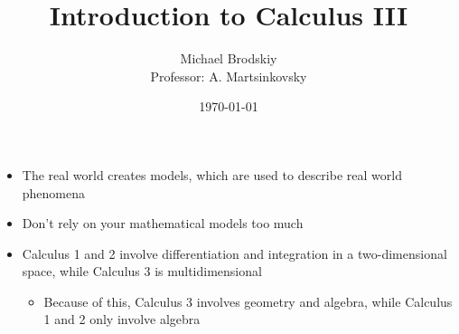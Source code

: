 


\title{Introduction to Calculus III}
\date{\today}
\author{Michael Brodskiy\\ \small Professor: A. Martsinkovsky}



\maketitle

\begin{itemize}

  \item The real world creates models, which are used to describe real world phenomena

  \item Don't rely on your mathematical models too much

  \item Calculus 1 and 2 involve differentiation and integration in a two-dimensional space, while Calculus 3 is multidimensional

    \begin{itemize}

      \item Because of this, Calculus 3 involves geometry and algebra, while Calculus 1 and 2 only involve algebra

    \end{itemize}

\end{itemize}



